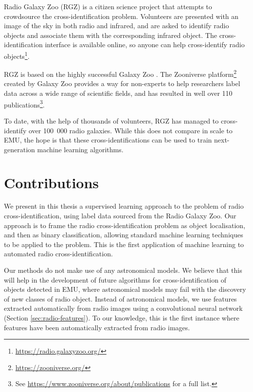 Radio Galaxy Zoo (RGZ) \citep{banfield15} is a citizen science project that
attempts to crowdsource the cross-identification problem. Volunteers are
presented with an image of the sky in both radio and infrared, and are asked to
identify radio objects and associate them with the corresponding infrared
object. The cross-identification interface is available online, so anyone can
help cross-identify radio objects\footnote{\url{https://radio.galaxyzoo.org/}}.

RGZ is based on the highly successful Galaxy Zoo \citep{lintott08, lintott11}.
The Zooniverse platform\footnote{\url{https://zooniverse.org/}} created by
Galaxy Zoo provides a way for non-experts to help researchers label data across
a wide range of scientific fields, and has resulted in well over 110
publications\footnote{See \url{https://www.zooniverse.org/about/publications}
for a full list.}.

To date, with the help of thousands of volunteers, RGZ has managed to
cross-identify over 100~000 radio galaxies. While this does not compare in scale
to EMU, the hope is that these cross-identifications can be used to train
next-generation machine learning algorithms.

\section{Contributions}
\label{sec:contributions}

  We present in this thesis a supervised learning approach to the problem of
  radio cross-identification, using label data sourced from the Radio Galaxy
  Zoo. Our approach is to frame the radio cross-identification problem as object
  localisation, and then as binary classification, allowing standard machine
  learning techniques to be applied to the problem. This is the first
  application of machine learning to automated radio cross-identification.

  Our methods do not make use of any astronomical models. We believe that this
  will help in the development of future algorithms for cross-identification of
  objects detected in EMU, where astronomical models may fail with the discovery
  of new classes of radio object. Instead of astronomical models, we use
  features extracted automatically from radio images using a convolutional
  neural network (Section \ref{sec:radio-features}). To our knowledge, this is
  the first instance where features have been automatically extracted from radio
  images.

